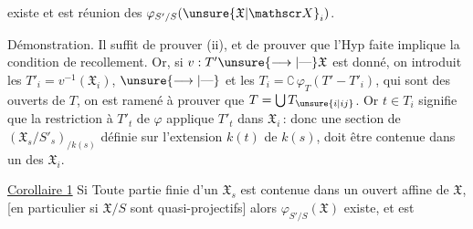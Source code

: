 existe et est réunion des $\varphi_{S'/S}(\unsure{\mathfrak X|\mathscr X}_i)$.

Démonstration. Il suffit de prouver (ii), et  de prouver que l'Hyp faite implique la condition de recollement. Or,
si $v:T'\unsure{\longrightarrow|\text{---}}\mathfrak X$ est donné, on introduit les $T'_i=v^{-1}(\mathfrak X_i)$, $\unsure{\longrightarrow|\text{---}}$ et les $T_i=\complement\,\varphi_T(T'-T'_i)$, qui sont des ouverts de $T$, on est ramené à prouver que $T=\bigcup T_{\unsure{i|ij}}$.
 Or $t\in T_i$ signifie que la restriction à $T'_t$ de $\varphi$ applique $T'_t$ dans $\mathfrak X_i$\,: donc une section de $(\mathfrak X_s/S'_s)_{/k(s)}$ définie sur l'extension $k(t)$ de $k(s)$, doit être contenue dans un des $\mathfrak X_i$.

\uline{Corollaire 1} Si Toute partie  finie  d'un $\mathfrak X_s$ est contenue dans un ouvert affine de $\mathfrak X$,  [en particulier si  $\mathfrak X/S$  sont quasi-projectifs] alors $\varphi_{S'/S}(\mathfrak X)$ existe, et est
